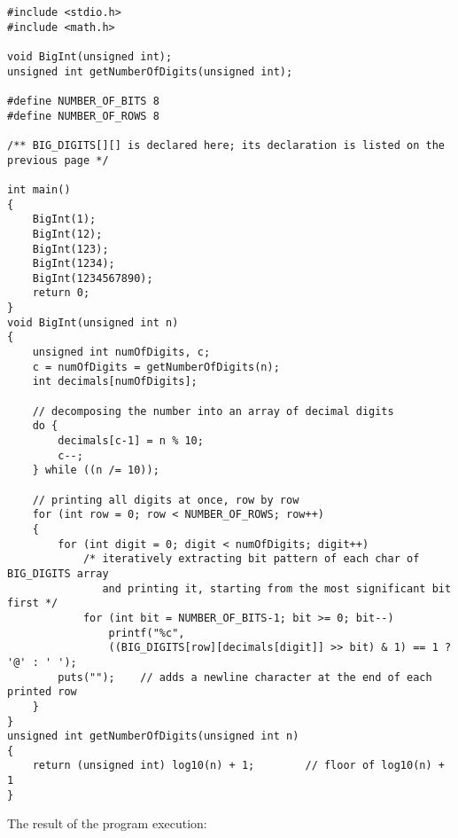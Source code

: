 \documentclass{article}
\begin{document}
	\begin{verbatim}
#include <stdio.h>
#include <math.h>

void BigInt(unsigned int);
unsigned int getNumberOfDigits(unsigned int);

#define NUMBER_OF_BITS 8
#define NUMBER_OF_ROWS 8

/** BIG_DIGITS[][] is declared here; its declaration is listed on the previous page */

int main() 
{
    BigInt(1);
    BigInt(12);
    BigInt(123);
    BigInt(1234);
    BigInt(1234567890);
    return 0;
}
void BigInt(unsigned int n)
{
    unsigned int numOfDigits, c;
    c = numOfDigits = getNumberOfDigits(n);
    int decimals[numOfDigits];

    // decomposing the number into an array of decimal digits
    do {
        decimals[c-1] = n % 10;
        c--;
    } while ((n /= 10));

    // printing all digits at once, row by row
    for (int row = 0; row < NUMBER_OF_ROWS; row++)
    {
        for (int digit = 0; digit < numOfDigits; digit++)
            /* iteratively extracting bit pattern of each char of BIG_DIGITS array
               and printing it, starting from the most significant bit first */
            for (int bit = NUMBER_OF_BITS-1; bit >= 0; bit--)
                printf("%c", 
                ((BIG_DIGITS[row][decimals[digit]] >> bit) & 1) == 1 ? '@' : ' ');
        puts("");    // adds a newline character at the end of each printed row
    }
}
unsigned int getNumberOfDigits(unsigned int n) 
{
    return (unsigned int) log10(n) + 1;        // floor of log10(n) + 1
}
	\end{verbatim}
	
	
	\noindent The result of the program execution:
	
\end{document}
